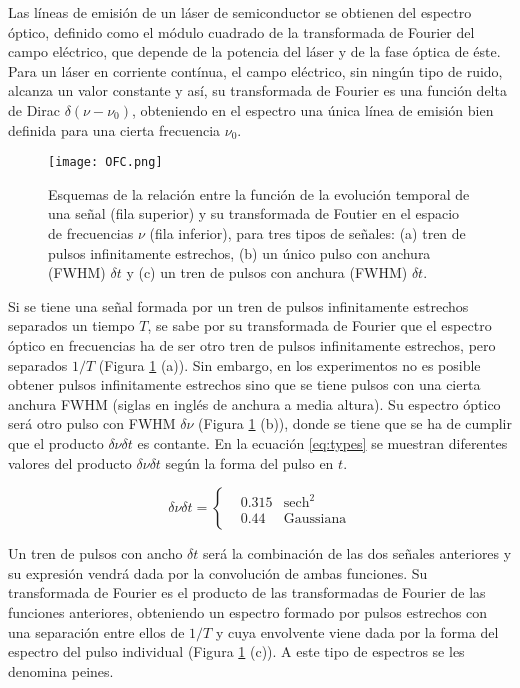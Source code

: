 

Las l\'ineas de emisi\'on de un l\'aser de semiconductor se obtienen del espectro \'optico, definido como el m\'odulo cuadrado de la transformada de Fourier del campo el\'ectrico, que depende de la potencia del l\'aser y de la fase \'optica de \'este. Para un l\'aser en corriente cont\'inua, el campo el\'ectrico, sin ningún tipo de ruido,  alcanza un valor constante y as\'i, su transformada de Fourier es una funci\'on delta de Dirac $\delta(\nu-\nu_0)$, obteniendo en el espectro una \'unica l\'inea de emisi\'on bien definida para una cierta frecuencia $\nu_0$.

	\begin{figure}[H]
		\centering
		\texttt{[image: OFC.png]}
		\caption{\label{Img:FFtPulsos}Esquemas de la relaci\'on entre la funci\'on de la evolución temporal de una señal (fila superior) y su transformada de Foutier en el espacio de frecuencias $\nu$ (fila inferior), para tres tipos de señales: (a) tren de pulsos infinitamente estrechos, (b) un \'unico pulso con anchura (FWHM) $\delta t$ y (c) un tren de pulsos con anchura (FWHM) $\delta t$.}
	\end{figure}

Si se tiene una señal formada por un tren de pulsos infinitamente estrechos separados un tiempo $T$, se sabe por su transformada de Fourier que el espectro \'optico en frecuencias ha de ser otro tren de pulsos infinitamente estrechos, pero separados $1/T$ (Figura \ref{Img:FFtPulsos} (a)). Sin embargo, en los experimentos no es posible obtener pulsos infinitamente estrechos sino que se tiene pulsos con una cierta anchura FWHM (siglas en ingl\'es de anchura a media altura). Su espectro \'optico ser\'a otro pulso con FWHM $\delta\nu$ (Figura \ref{Img:FFtPulsos} (b)), donde se tiene que se ha de cumplir que el producto $\delta\nu\delta t$ es contante. En la ecuaci\'on \ref{eq:types} se muestran diferentes valores del producto $\delta\nu\delta t$ seg\'un la forma del pulso en $t$.

	\begin{equation}
		\delta\nu\delta t = 
			\left\{\begin{matrix}
				& 0.315 & \textrm{sech}^2 \\
				& 0.44 & \textrm{Gaussiana}
			\end{matrix}\right.
		\label{eq:types}
	\end{equation}

	Un tren de pulsos con ancho $\delta t$ ser\'a la combinaci\'on de las dos señales anteriores y su expresi\'on vendr\'a dada por la convoluci\'on de ambas funciones. Su transformada de Fourier es el producto de las transformadas de Fourier de las funciones anteriores, obteniendo un espectro formado por pulsos estrechos con una separaci\'on entre ellos de $1/T$ y cuya envolvente viene dada por la forma del espectro del pulso individual (Figura \ref{Img:FFtPulsos} (c)). A este tipo de espectros se les denomina peines.

